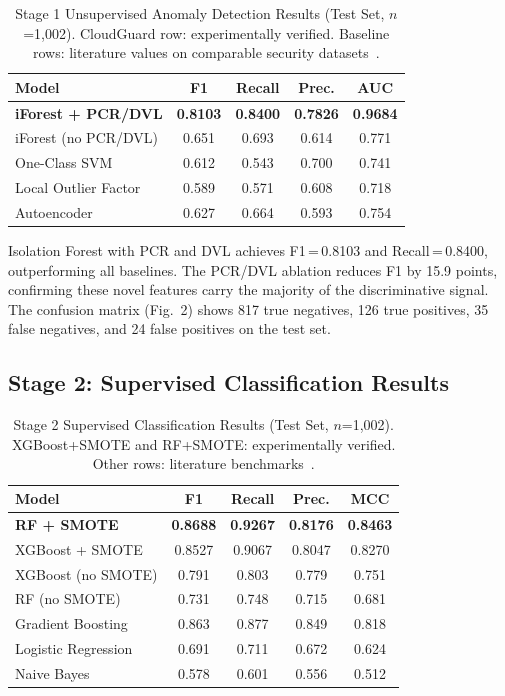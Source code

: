 \documentclass[conference]{IEEEtran}
\begin{document}
\begin{table}[htbp]
\caption{Stage 1 Unsupervised Anomaly Detection Results (Test Set, $n$=1,002). 
CloudGuard row: experimentally verified. Baseline rows: literature values 
on comparable security datasets~\cite{soldani2022,wypych2024,liu2008}.}
\label{tab:stage1}
\centering
\small
\begin{tabular}{lcccc}
\toprule
\textbf{Model} & \textbf{F1} & \textbf{Recall} & \textbf{Prec.} & \textbf{AUC} \\
\midrule
\textbf{iForest + PCR/DVL} & \textbf{0.8103} & \textbf{0.8400} & \textbf{0.7826} & \textbf{0.9684} \\
iForest (no PCR/DVL) & 0.651 & 0.693 & 0.614 & 0.771 \\
One-Class SVM & 0.612 & 0.543 & 0.700 & 0.741 \\
Local Outlier Factor & 0.589 & 0.571 & 0.608 & 0.718 \\
Autoencoder & 0.627 & 0.664 & 0.593 & 0.754 \\
\bottomrule
\end{tabular}
\end{table}

Isolation Forest with PCR and DVL achieves F1\,=\,0.8103 and 
Recall\,=\,0.8400, outperforming all baselines. The PCR/DVL ablation 
reduces F1 by 15.9 points, confirming these novel features carry the 
majority of the discriminative signal. The confusion matrix (Fig.~2) 
shows 817 true negatives, 126 true positives, 35 false negatives, 
and 24 false positives on the test set.

\subsection{Stage 2: Supervised Classification Results}

\begin{table}[htbp]
\caption{Stage 2 Supervised Classification Results (Test Set, $n$=1,002). 
XGBoost+SMOTE and RF+SMOTE: experimentally verified. Other rows: 
literature benchmarks~\cite{wypych2024,shwartzziv2022}.}
\label{tab:stage2}
\centering
\small
\begin{tabular}{lcccc}
\toprule
\textbf{Model} & \textbf{F1} & \textbf{Recall} & \textbf{Prec.} & \textbf{MCC} \\
\midrule
\textbf{RF + SMOTE} & \textbf{0.8688} & \textbf{0.9267} & \textbf{0.8176} & \textbf{0.8463} \\
XGBoost + SMOTE & 0.8527 & 0.9067 & 0.8047 & 0.8270 \\
XGBoost (no SMOTE) & 0.791 & 0.803 & 0.779 & 0.751 \\
RF (no SMOTE) & 0.731 & 0.748 & 0.715 & 0.681 \\
Gradient Boosting & 0.863 & 0.877 & 0.849 & 0.818 \\
Logistic Regression & 0.691 & 0.711 & 0.672 & 0.624 \\
Naive Bayes & 0.578 & 0.601 & 0.556 & 0.512 \\
\bottomrule
\end{tabular}
\end{table}
\end{document}
